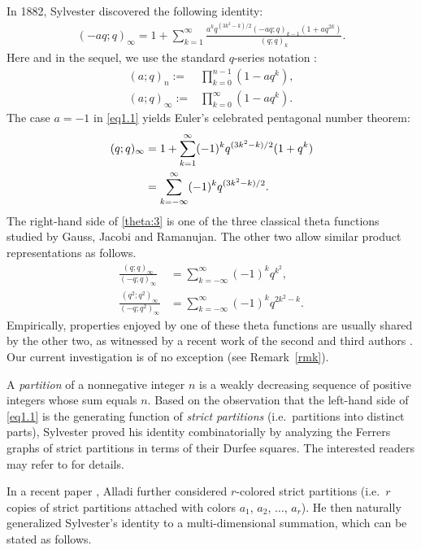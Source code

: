 \documentclass[12pt,reqno]{amsart}
\numberwithin{equation}{section}
\theoremstyle{plain}
\theoremstyle{definition}
\begin{document}
In 1882, Sylvester \cite{Syl} discovered the following identity:
\begin{align}
\label{eq1.1}
(-aq;q)_{\infty}=1+\sum_{k=1}^{\infty}\frac{a^{k}q^{(3k^{2}-k)/2}(-aq;q)_{k-1}(1+aq^{2k})}{(q;q)_{k}}.
\end{align}
Here and in the sequel, we use the standard $q$-series notation \cite{Andr}:
\begin{align*}
(a;q)_n:=&\prod_{k= 0}^{n-1} (1-aq^k),\\
(a;q)_\infty:=&\prod_{k= 0}^\infty (1-aq^k).
\end{align*}
The case $a=-1$ in \eqref{eq1.1} yields Euler's celebrated pentagonal number theorem:
\begin{align}\label{theta:3}
(q;q)_{\infty} &=1+\sum_{k=1}^{\infty}(-1)^{k}q^{(3k^{2}-k)/2}(1+q^{k})\notag\\
 &=\sum_{k=-\infty}^{\infty}(-1)^{k}q^{(3k^{2}-k)/2}.
\end{align}
The right-hand side of \eqref{theta:3} is one of the three classical theta functions studied by Gauss, Jacobi and Ramanujan. The other two allow similar product representations as follows.
\begin{align}
\label{theta:2}
\frac{(q;q)_{\infty}}{(-q;q)_{\infty}} &=\sum_{k=-\infty}^{\infty}(-1)^{k}q^{k^2},\\
\label{theta:4}
\frac{(q^2;q^2)_{\infty}}{(-q;q^2)_{\infty}} &=\sum_{k=-\infty}^{\infty}(-1)^{k}q^{2k^{2}-k}.
\end{align}
Empirically, properties enjoyed by one of these theta functions are usually shared by the other two, as witnessed by a recent work of the second and third authors \cite{FT2}. Our current investigation is of no exception (see Remark~\ref{rmk}).

A \emph{partition} of a nonnegative integer $n$ is a weakly decreasing sequence of positive integers whose sum equals $n$. Based on the observation that the left-hand side of \eqref{eq1.1} is the generating function of \emph{strict partitions} (i.e.~partitions into distinct parts), Sylvester proved his identity combinatorially by analyzing the Ferrers graphs of strict partitions in terms of their Durfee squares. The interested readers may refer to \cite{Andr3} for details.

In a recent paper \cite{All}, Alladi further considered $r$-colored strict partitions (i.e.~$r$ copies of strict partitions attached with colors $a_{1}$, $a_{2}$, $\ldots$, $a_{r}$). He then naturally generalized Sylvester's identity to a multi-dimensional summation, which can be stated as follows.
\end{document}

